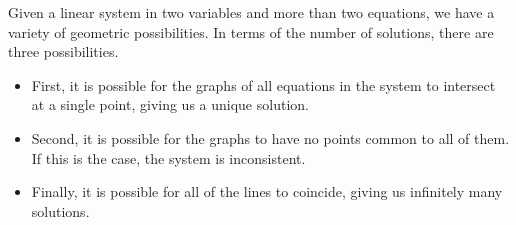 \documentclass{ximera}
\begin{document}
                  Given a linear system in two variables and more than two equations, we have a variety of geometric possibilities.  In terms of the number of solutions, there are three possibilities.
       
                  \begin{itemize}
                  \item First, it is possible for the graphs of all equations in the system to intersect at a single point, giving us a unique solution. 
                   
                  \begin{center}
                  \end{center}
                   
                  \item Second, it is possible for the graphs to have no points common to all of them.  If this is the case, the system is inconsistent.
                   
                  \begin{center}
                  \end{center}
                   
                  \item Finally, it is possible for all of the lines to coincide, giving us infinitely many solutions.
                  

\end{itemize}
\end{document}
